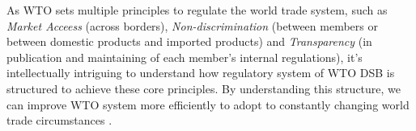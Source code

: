 As WTO sets multiple principles to regulate the world trade system, 
such as \textit{Market Acceess} (across borders), 
\textit{Non-discrimination} (between members 
or between domestic products and imported products) 
and \textit{Transparency} (in publication and maintaining 
of each member's internal regulations), 
it's intellectually intriguing 
to understand how regulatory system of WTO DSB
is structured to achieve these core principles.
By understanding this structure, 
we can improve WTO system more efficiently 
to adopt to constantly 
changing world trade circumstances
\citep{FREDEBEULKREIN1999625, shaffer_2004, 10.1093/jiel/jgm028}.



